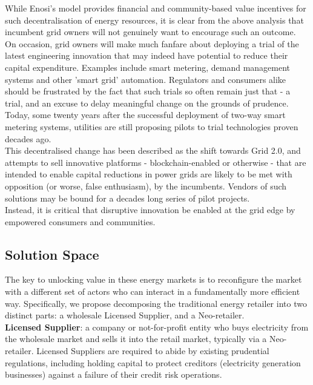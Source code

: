 \documentclass{article}
\theoremstyle{definition}
\theoremstyle{plain} %
\begin{document}
\noindent While Enosi's model provides financial and community-based value incentives for such decentralisation of energy resources, it is clear from the above analysis that incumbent grid owners will not genuinely want to encourage such an outcome. \\

\noindent On occasion, grid owners will make much fanfare about deploying a trial of the latest engineering innovation that may indeed have potential to reduce their capital expenditure.  Examples include smart metering, demand management systems and other 'smart grid' automation. Regulators and consumers alike should be frustrated by the fact that such trials so often remain just that - a trial, and an excuse to delay meaningful change on the grounds of prudence. Today, some twenty years after the successful deployment of two-way smart metering systems, utilities are still proposing pilots to trial technologies proven decades ago. \\

\noindent This decentralised change has been described as the shift towards Grid 2.0, and attempts to sell innovative platforms - blockchain-enabled or otherwise - that are intended to enable capital reductions in power grids are likely to be met with opposition (or worse, false enthusiasm), by the incumbents. Vendors of such solutions may be bound for a decades long series of pilot projects. \\

\noindent Instead, it is critical that disruptive innovation be enabled at the grid edge by empowered consumers and communities.

\subsection{Solution Space}

The key to unlocking value in these energy markets is to reconfigure the market with a different set of actors who can interact in a fundamentally more efficient way. Specifically, we propose decomposing the traditional energy retailer into two distinct parts: a wholesale Licensed Supplier, and a Neo-retailer.\\

\noindent \textbf{Licensed Supplier}: a company or not-for-profit entity who buys electricity from the wholesale market and sells it into the retail market, typically via a Neo-retailer. Licensed Suppliers are required to abide by existing prudential regulations, including holding capital to protect creditors (electricity generation businesses) against a failure of their credit risk operations.\\
\end{document}
